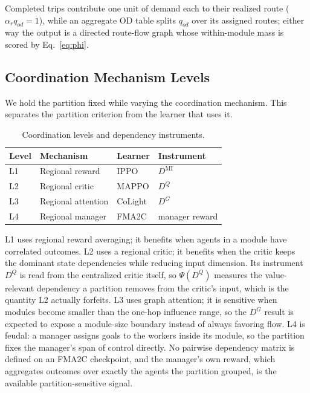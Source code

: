 \documentclass[journal]{IEEEtran}
\theoremstyle{definition}
\begin{document}
Completed trips contribute one unit of demand each to their realized route ($\alpha_r q_{od}=1$), while an aggregate OD table splits $q_{od}$ over its assigned routes; either way the output is a directed route-flow graph whose within-module mass is scored by Eq.~\eqref{eq:phi}.

\subsection{Coordination Mechanism Levels}
\label{sec:levels}

We hold the partition fixed while varying the coordination mechanism.
This separates the partition criterion from the learner that uses it.

\begin{table}[t]
    \centering
    \caption{Coordination levels and dependency instruments.}
    \label{tab:levels}
    \footnotesize
    \begin{tabular}{llll}
        \toprule
        Level & Mechanism          & Learner & Instrument        \\
        \midrule
        L1    & Regional reward    & IPPO    & $D^{\mathrm{MI}}$ \\
        L2    & Regional critic    & MAPPO   & $D^{Q}$           \\
        L3    & Regional attention & CoLight & $D^{G}$           \\
        L4    & Regional manager   & FMA2C   & manager reward    \\
        \bottomrule
    \end{tabular}
\end{table}

L1 uses regional reward averaging; it benefits when agents in a module have
correlated outcomes. L2 uses a regional critic; it benefits when the critic keeps the dominant state dependencies while reducing input dimension. Its instrument $D^{Q}$ is read from the centralized critic itself, so $\Psi(D^{Q})$ measures the value-relevant dependency a partition removes from the critic's input, which is the quantity L2 actually forfeits. L3 uses graph attention; it is sensitive when modules become smaller than the one-hop influence range, so the $D^G$ result is expected to expose a module-size boundary instead of always favoring flow. L4 is feudal: a manager assigns goals to the workers inside its module, so the partition fixes the manager's span of control directly. No pairwise dependency matrix is defined on an FMA2C checkpoint, and the manager's own reward, which aggregates outcomes over exactly the agents the partition grouped, is the available partition-sensitive signal.
\end{document}
